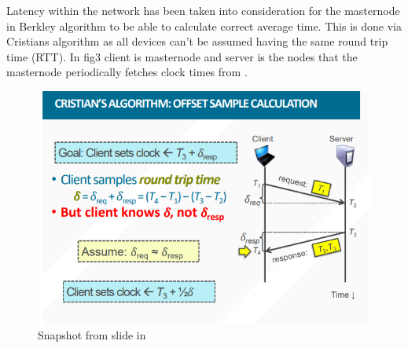\documentclass[article,a4paper]{IEEEtran}
\begin{document}
\newline\newline
Latency within the network has been taken into consideration for the masternode in Berkley algorithm to be able to calculate correct average time. This is done via Cristians algorithm as all devices can't be assumed having the same round trip time (RTT). In fig3 client is masternode and server is the nodes that the masternode periodically fetches clock times from \cite{Christianalgo}. 
\begin{figure}
    \includegraphics[width=\columnwidth]{Cristianalgo.png} 
    \caption{ Snapshot from slide in \cite{Timesyncslides} }
    \label{fig3: Cristianalgo }   
\end{figure}
\end{document}

